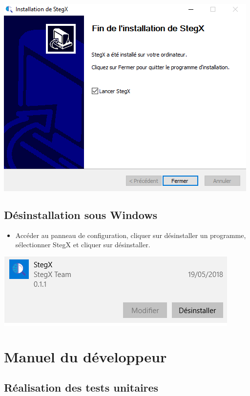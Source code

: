\documentclass[11pt]{article}
\begin{document}
\hspace{1cm}
\includegraphics[scale=1]{pictures/fin.png}
\vspace{1cm}

\subsection{Désinstallation sous Windows}

\begin{itemize}
\item Accéder au panneau de configuration, cliquer sur désinstaller un programme,
sélectionner StegX et cliquer sur désinstaller.
\end{itemize}

\hspace{3cm}
\includegraphics[scale=0.6]{pictures/desinstall.png}
\vspace{1cm}
\newpage

\section{Manuel du développeur}

\subsection{Réalisation des tests unitaires}
\end{document}
